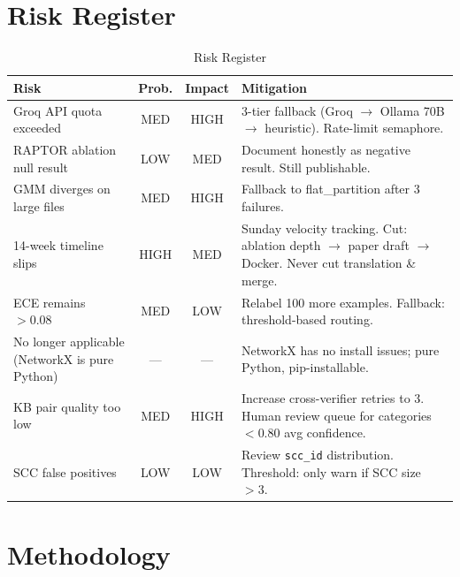 \documentclass[11pt,a4paper]{article}
\begin{document}
\section{Risk Register}

\begin{table}[H]
\centering
\caption{Risk Register}
\renewcommand{\arraystretch}{1.3}
\small
\begin{tabularx}{\textwidth}{@{} L{3.2cm} c c X @{}}
\toprule
\textbf{Risk} & \textbf{Prob.} & \textbf{Impact} & \textbf{Mitigation} \\
\midrule
Groq API quota exceeded & MED & HIGH & 3-tier fallback (Groq $\to$ Ollama 70B $\to$ heuristic). Rate-limit semaphore. \\
RAPTOR ablation null result & LOW & MED & Document honestly as negative result. Still publishable. \\
GMM diverges on large files & MED & HIGH & Fallback to flat\_partition after 3 failures. \\
14-week timeline slips & HIGH & MED & Sunday velocity tracking. Cut: ablation depth $\to$ paper draft $\to$ Docker. Never cut translation \& merge. \\
ECE remains $> 0.08$ & MED & LOW & Relabel 100 more examples. Fallback: threshold-based routing. \\
No longer applicable (NetworkX is pure Python) & — & — & NetworkX has no install issues; pure Python, pip-installable. \\
KB pair quality too low & MED & HIGH & Increase cross-verifier retries to 3. Human review queue for categories $< 0.80$ avg confidence. \\
SCC false positives & LOW & LOW & Review \texttt{scc\_id} distribution. Threshold: only warn if SCC size $> 3$. \\
\bottomrule
\end{tabularx}
\end{table}


\section{Methodology}
\end{document}
